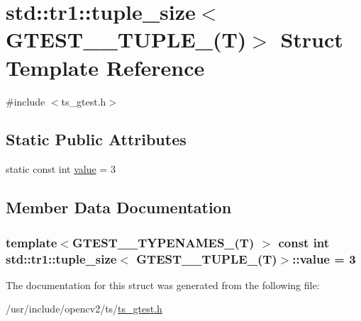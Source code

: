 \hypertarget{structstd_1_1tr1_1_1tuple__size_3_01GTEST__3__TUPLE___07T_08_4}{\section{std\-:\-:tr1\-:\-:tuple\-\_\-size$<$ G\-T\-E\-S\-T\-\_\-\_\-\-T\-U\-P\-L\-E\-\_\-(T)$>$ Struct Template Reference}
\label{structstd_1_1tr1_1_1tuple__size_3_01GTEST__3__TUPLE___07T_08_4}
}


{\ttfamily \#include $<$ts\-\_\-gtest.\-h$>$}

\subsection*{Static Public Attributes}
\begin{DoxyCompactItemize}
\item 
static const int \hyperlink{structstd_1_1tr1_1_1tuple__size_3_01GTEST__3__TUPLE___07T_08_4_a71961f7efda10ed710fffd6e3e74c709}{value} = 3
\end{DoxyCompactItemize}


\subsection{Member Data Documentation}
\hypertarget{structstd_1_1tr1_1_1tuple__size_3_01GTEST__3__TUPLE___07T_08_4_a71961f7efda10ed710fffd6e3e74c709}{
\subsubsection[{value}]{\setlength{\rightskip}{0pt plus 5cm}template$<$G\-T\-E\-S\-T\-\_\-\_\-\-T\-Y\-P\-E\-N\-A\-M\-E\-S\-\_\-(\-T) $>$ const int {\bf std\-::tr1\-::tuple\-\_\-size}$<$ {\bf G\-T\-E\-S\-T\-\_\-\_\-\-T\-U\-P\-L\-E\-\_\-}({\bf T})$>$\-::value = 3\hspace{0.3cm}{\ttfamily [static]}}}\label{structstd_1_1tr1_1_1tuple__size_3_01GTEST__3__TUPLE___07T_08_4_a71961f7efda10ed710fffd6e3e74c709}


The documentation for this struct was generated from the following file\-:\begin{DoxyCompactItemize}
\item 
/usr/include/opencv2/ts/\hyperlink{ts__gtest_8h}{ts\-\_\-gtest.\-h}\end{DoxyCompactItemize}
